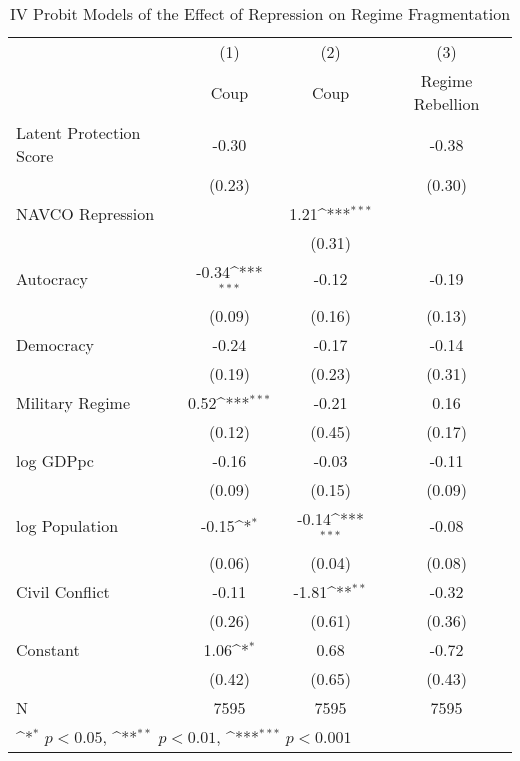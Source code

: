 \begin{table}[htbp]\centering
\def\sym#1{\ifmmode^{#1}\else\(^{#1}\)\fi}
\caption{\label{tab4} IV Probit Models of the Effect of Repression on Regime Fragmentation}
\begin{tabular}{l*{3}{c}}
\hline\hline
                    &\multicolumn{1}{c}{(1)}         &\multicolumn{1}{c}{(2)}         &\multicolumn{1}{c}{(3)}         \\
                    &        Coup         &        Coup         &Regime Rebellion         \\
\hline
Latent Protection Score&       -0.30         &                     &       -0.38         \\
                    &      (0.23)         &                     &      (0.30)         \\
NAVCO Repression    &                     &        1.21\sym{***}&                     \\
                    &                     &      (0.31)         &                     \\
Autocracy           &       -0.34\sym{***}&       -0.12         &       -0.19         \\
                    &      (0.09)         &      (0.16)         &      (0.13)         \\
Democracy           &       -0.24         &       -0.17         &       -0.14         \\
                    &      (0.19)         &      (0.23)         &      (0.31)         \\
Military Regime     &        0.52\sym{***}&       -0.21         &        0.16         \\
                    &      (0.12)         &      (0.45)         &      (0.17)         \\
log GDPpc           &       -0.16         &       -0.03         &       -0.11         \\
                    &      (0.09)         &      (0.15)         &      (0.09)         \\
log Population      &       -0.15\sym{*}  &       -0.14\sym{***}&       -0.08         \\
                    &      (0.06)         &      (0.04)         &      (0.08)         \\
Civil Conflict      &       -0.11         &       -1.81\sym{**} &       -0.32         \\
                    &      (0.26)         &      (0.61)         &      (0.36)         \\
Constant            &        1.06\sym{*}  &        0.68         &       -0.72         \\
                    &      (0.42)         &      (0.65)         &      (0.43)         \\
\hline
N                   &        7595         &        7595         &        7595         \\
\hline\hline
\multicolumn{4}{l}{\footnotesize \sym{*} \(p<0.05\), \sym{**} \(p<0.01\), \sym{***} \(p<0.001\)}\\
\end{tabular}
\end{table}
